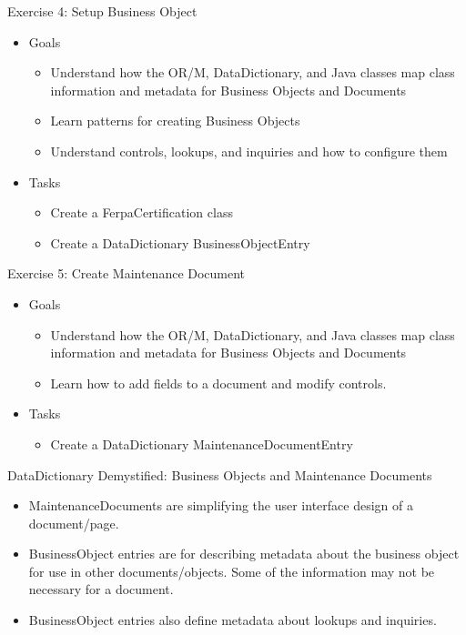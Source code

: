 \documentclass[xcolor=dvipsnames,14pt]{beamer}
\begin{document}
\begin{frame}{Exercise 4: Setup Business Object}
	\begin{itemize}
		\item Goals
          \begin{itemize}
            \item Understand how the OR/M, DataDictionary, and Java
              classes map class information and metadata for Business
              Objects and Documents
            \item Learn patterns for creating Business Objects
            \item Understand controls, lookups, and inquiries and how
              to configure them
          \end{itemize}          
		\item Tasks	
          \begin{itemize}
            \item Create a FerpaCertification class
            \item Create a DataDictionary BusinessObjectEntry
          \end{itemize}          
\end{itemize}
\end{frame}

\begin{frame}{Exercise 5: Create Maintenance Document}
	\begin{itemize}
		\item Goals
          \begin{itemize}
            \item Understand how the OR/M, DataDictionary, and Java
              classes map class information and metadata for Business
              Objects and Documents
            \item Learn how to add fields to a document and modify controls.
          \end{itemize}          
		\item Tasks	
          \begin{itemize}
            \item Create a DataDictionary MaintenanceDocumentEntry
          \end{itemize}          
        \end{itemize}
\end{frame}

\begin{frame}{DataDictionary Demystified: Business Objects and
    Maintenance Documents}
  \begin{itemize}
    \item MaintenanceDocuments are simplifying the user interface
      design of a document/page.
    \item BusinessObject entries are for describing metadata about the
      business object for use in other documents/objects. Some of the
      information may not be necessary for a document.
    \item BusinessObject entries also define metadata about lookups
      and inquiries.
  \end{itemize}           
\end{frame}
\end{document}
